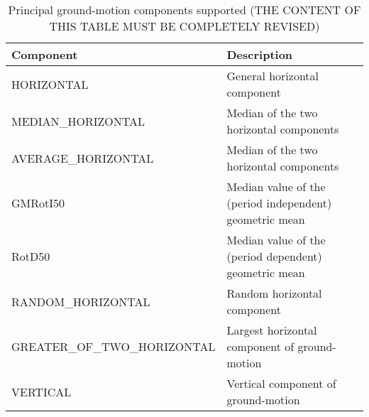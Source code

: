 \begin{table}[!h]
\centering
\begin{tabular}{|p{6cm}p{7cm}|}
\hline
\rowcolor{anti-flashwhite}
\bf{Component} & \bf{Description} \\
\hline 
HORIZONTAL & General horizontal component \\
MEDIAN\_HORIZONTAL & Median of the two horizontal components \\
AVERAGE\_HORIZONTAL & Median of the two horizontal components \\
GMRotI50 & Median value of the (period independent) geometric mean 
           \parencite{boore2006} \\
RotD50 & Median value of the (period dependent) geometric mean 
         \parencite{boore2010} \\
RANDOM\_HORIZONTAL & Random horizontal component \\
GREATER\_OF\_TWO\_HORIZONTAL & Largest horizontal component of ground-motion \\
VERTICAL & Vertical component of ground-motion\\
\hline
\end{tabular}
\caption{Principal ground-motion components supported (THE CONTENT OF THIS 
TABLE MUST BE COMPLETELY REVISED)}
\label{tab:hor_comp} 
\end{table}
